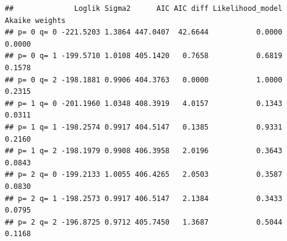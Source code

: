 \documentclass[
  11pt,
]{article}
\newenvironment{Shaded}{\begin{snugshade}}{\end{snugshade}}
\newcommand{\CommentTok}[1]{\textcolor[rgb]{0.56,0.35,0.01}{\textit{#1}}}
\newcommand{\ControlFlowTok}[1]{\textcolor[rgb]{0.13,0.29,0.53}{\textbf{#1}}}
\newcommand{\DataTypeTok}[1]{\textcolor[rgb]{0.13,0.29,0.53}{#1}}
\newcommand{\DecValTok}[1]{\textcolor[rgb]{0.00,0.00,0.81}{#1}}
\newcommand{\FloatTok}[1]{\textcolor[rgb]{0.00,0.00,0.81}{#1}}
\newcommand{\KeywordTok}[1]{\textcolor[rgb]{0.13,0.29,0.53}{\textbf{#1}}}
\newcommand{\NormalTok}[1]{#1}
\newcommand{\OperatorTok}[1]{\textcolor[rgb]{0.81,0.36,0.00}{\textbf{#1}}}
\newcommand{\StringTok}[1]{\textcolor[rgb]{0.31,0.60,0.02}{#1}}
\begin{document}
\begin{Shaded}
\end{Shaded}

\begin{verbatim}
##              Loglik Sigma2      AIC AIC diff Likelihood_model Akaike weights
## p= 0 q= 0 -221.5203 1.3864 447.0407  42.6644           0.0000         0.0000
## p= 0 q= 1 -199.5710 1.0108 405.1420   0.7658           0.6819         0.1578
## p= 0 q= 2 -198.1881 0.9906 404.3763   0.0000           1.0000         0.2315
## p= 1 q= 0 -201.1960 1.0348 408.3919   4.0157           0.1343         0.0311
## p= 1 q= 1 -198.2574 0.9917 404.5147   0.1385           0.9331         0.2160
## p= 1 q= 2 -198.1979 0.9908 406.3958   2.0196           0.3643         0.0843
## p= 2 q= 0 -199.2133 1.0055 406.4265   2.0503           0.3587         0.0830
## p= 2 q= 1 -198.2573 0.9917 406.5147   2.1384           0.3433         0.0795
## p= 2 q= 2 -196.8725 0.9712 405.7450   1.3687           0.5044         0.1168
\end{verbatim}
\end{document}
